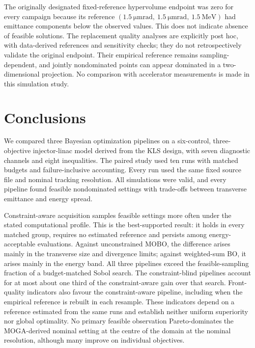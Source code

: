 \documentclass[aps,prab,reprint,superscriptaddress,amsmath,amssymb,floatfix]{revtex4-2}
\begin{document}
The originally designated fixed-reference hypervolume endpoint was zero for every campaign
because its reference $(\SI{1.5}{\micro\metre\radian},\ \SI{1.5}{\micro\metre\radian},\
\SI{1.5}{\mega\electronvolt})$ had emittance components below the observed values. This does
not indicate absence of feasible solutions. The replacement quality analyses are explicitly
post hoc, with data-derived references and sensitivity checks; they do not retrospectively
validate the original endpoint. Their empirical reference remains sampling-dependent, and
jointly nondominated points can appear dominated in a two-dimensional projection. No
comparison with accelerator measurements is made in this simulation study.

\section{Conclusions}
\label{sec:conclusions}
We compared three Bayesian optimization pipelines on a six-control, three-objective
injector-linac model derived from the KLS design, with seven diagnostic channels and eight
inequalities. The paired study used ten runs with matched budgets and failure-inclusive
accounting. Every run used the same fixed source file and nominal tracking resolution. All
simulations were valid, and every pipeline found feasible
nondominated settings with trade-offs between transverse emittance and energy spread.

Constraint-aware acquisition samples feasible settings more often under the stated computational
profile. This is the best-supported result: it holds in every matched group, requires no
estimated reference and persists among energy-acceptable evaluations. Against unconstrained
MOBO, the difference arises mainly in the transverse size and divergence limits; against
weighted-sum BO, it arises mainly in the energy band. All three pipelines exceed the
feasible-sampling fraction of a budget-matched Sobol search. The constraint-blind pipelines
account for at most about one third of the constraint-aware gain over that search. Front-quality
indicators also favour the constraint-aware pipeline, including when the empirical reference is
rebuilt in each resample. These indicators depend on a reference estimated from the same runs
and establish neither uniform superiority nor global optimality. No primary feasible observation
Pareto-dominates the MOGA-derived nominal setting at the centre of the domain at the nominal
resolution, although many improve on individual objectives.
\end{document}
